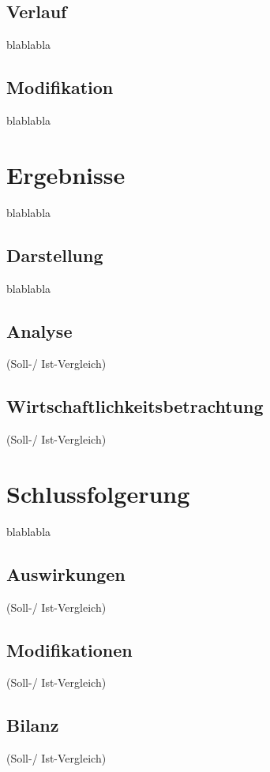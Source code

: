 \subsection{Verlauf}
\label{subsec:description:verlauf}
blablabla

\subsection{Modifikation}
\label{subsec:description:modifikation}
blablabla

\section{Ergebnisse}
\label{sec:description:ergebnisse}
blablabla

\subsection{Darstellung}
\label{subsec:description:darstellung}
blablabla

\subsection{Analyse}
\label{subsec:description:analyse}
(Soll-/ Ist-Vergleich)

\subsection{Wirtschaftlichkeitsbetrachtung}
\label{subsec:description:ergebnisse:wirtschaftlichkeitsbetrachtung}
(Soll-/ Ist-Vergleich)

\section{Schlussfolgerung}
\label{sec:description:schlussfolgerung}
blablabla

\subsection{Auswirkungen}
\label{subsec:description:auswirkungen}
(Soll-/ Ist-Vergleich)

\subsection{Modifikationen}
\label{subsec:description:modifikationen}
(Soll-/ Ist-Vergleich)

\subsection{Bilanz}
\label{subsec:description:bilanz}
(Soll-/ Ist-Vergleich)
